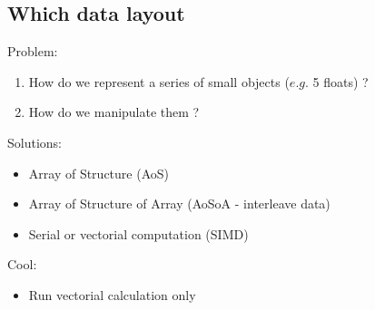 \documentclass{beamer}
\begin{document}
\subsection*{Which data layout}
\begin{frame}
Problem: 
\begin{enumerate}
\item How do we represent a series of small objects ($e.g.$ 5 floats) ? 
\item How do we manipulate them ? 
\end{enumerate}
Solutions:
\begin{itemize}
\item Array of Structure  (AoS)
\item  Array of Structure of Array (AoSoA - interleave data)
\item Serial or vectorial computation (SIMD)
\end{itemize}

Cool:
\begin{itemize}
\item Run vectorial calculation only
\end{itemize}
 
\end{frame}



\end{document}
